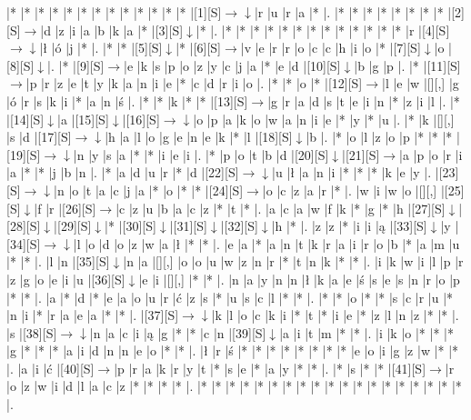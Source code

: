 \documentclass[11pt]{article}
\newcommand\drarr{$\rightarrow \!\!\!\!\! \downarrow$}
\newcommand\rarr{$\rightarrow$}
\newcommand\darr{$\downarrow$}
\begin{document}
\noindent\begin{Puzzle}{18}{29}|*	|*	|*	|*	|*	|*	|*	|*	|*	|*	|*	|*	|*	|[1][S]\drarr	|r	|u	|r	|a	|*	|.
|*	|*	|*	|*	|*	|*	|*	|*	|[2][S]\rarr	|d	|z	|i	|a	|b	|k	|a	|*	|[3][S]\darr	|*	|.
|*	|*	|*	|*	|*	|*	|*	|*	|*	|*	|*	|*	|*	|r	|[4][S]\drarr	|ł	|ó	|j	|*	|.
|*	|*	|[5][S]\darr	|*	|[6][S]\rarr	|v	|e	|r	|r	|o	|c	|c	|h	|i	|o	|*	|[7][S]\darr	|o	|[8][S]\darr	|.
|*	|[9][S]\rarr	|e	|k	|s	|p	|o	|z	|y	|c	|j	|a	|*	|e	|d	|[10][S]\darr	|b	|g	|p	|.
|*	|[11][S]\rarr	|p	|r	|z	|e	|t	|y	|k	|a	|n	|i	|e	|*	|c	|d	|r	|i	|o	|.
|*	|*	|o	|*	|[12][S]\rarr	|l	|e	|w	|[][,]{ }	|g	|ó	|r	|s	|k	|i	|*	|a	|n	|ś	|.
|*	|*	|k	|*	|*	|[13][S]\rarr	|g	|r	|a	|d	|s	|t	|e	|i	|n	|*	|z	|i	|l	|.
|*	|[14][S]\darr	|a	|[15][S]\darr	|[16][S]\drarr	|o	|p	|a	|k	|o	|w	|a	|n	|i	|e	|*	|y	|*	|u	|.
|*	|k	|[][,]{ }	|s	|d	|[17][S]\drarr	|h	|a	|l	|o	|g	|e	|n	|e	|k	|*	|l	|[18][S]\darr	|b	|.
|*	|o	|l	|z	|o	|p	|*	|*	|*	|[19][S]\drarr	|n	|y	|s	|a	|*	|*	|i	|e	|i	|.
|*	|p	|o	|t	|b	|d	|[20][S]\darr	|[21][S]\rarr	|a	|p	|o	|r	|i	|a	|*	|*	|j	|b	|n	|.
|*	|a	|d	|u	|r	|*	|d	|[22][S]\drarr	|u	|ł	|a	|n	|i	|*	|*	|*	|k	|e	|y	|.
|[23][S]\drarr	|n	|o	|t	|a	|c	|j	|a	|*	|o	|*	|*	|[24][S]\rarr	|o	|c	|z	|a	|r	|*	|.
|w	|i	|w	|o	|[][,]{ }	|[25][S]\darr	|f	|r	|[26][S]\rarr	|c	|z	|u	|b	|a	|c	|z	|*	|t	|*	|.
|a	|c	|a	|w	|f	|k	|*	|g	|*	|h	|[27][S]\darr	|[28][S]\darr	|[29][S]\darr	|*	|[30][S]\darr	|[31][S]\darr	|[32][S]\darr	|h	|*	|.
|z	|z	|*	|i	|i	|ą	|[33][S]\darr	|y	|[34][S]\drarr	|l	|o	|d	|o	|z	|w	|a	|ł	|*	|*	|.
|e	|a	|*	|a	|n	|t	|k	|r	|a	|i	|r	|o	|b	|*	|a	|m	|u	|*	|*	|.
|l	|n	|[35][S]\darr	|n	|a	|[][,]{ }	|o	|o	|u	|w	|z	|n	|r	|*	|t	|n	|k	|*	|*	|.
|i	|k	|w	|i	|l	|p	|r	|z	|g	|o	|e	|i	|u	|[36][S]\darr	|e	|i	|[][,]{ }	|*	|*	|.
|n	|a	|y	|n	|n	|ł	|k	|a	|e	|ś	|s	|e	|s	|n	|r	|o	|p	|*	|*	|.
|a	|*	|d	|*	|e	|a	|o	|u	|r	|ć	|z	|s	|*	|u	|s	|c	|l	|*	|*	|.
|*	|*	|o	|*	|*	|s	|c	|r	|u	|*	|n	|i	|*	|r	|a	|e	|a	|*	|*	|.
|[37][S]\drarr	|k	|l	|o	|c	|k	|i	|*	|t	|*	|i	|e	|*	|z	|l	|n	|z	|*	|*	|.
|s	|[38][S]\drarr	|n	|a	|c	|i	|ą	|g	|*	|*	|c	|n	|[39][S]\darr	|a	|i	|t	|m	|*	|*	|.
|i	|k	|o	|*	|*	|*	|g	|*	|*	|*	|a	|i	|d	|n	|n	|e	|o	|*	|*	|.
|ł	|r	|ś	|*	|*	|*	|*	|*	|*	|*	|*	|e	|o	|i	|g	|z	|w	|*	|*	|.
|a	|i	|ć	|[40][S]\rarr	|p	|r	|a	|k	|r	|y	|t	|*	|s	|e	|*	|a	|y	|*	|*	|.
|*	|s	|*	|*	|[41][S]\rarr	|r	|o	|z	|w	|i	|d	|l	|a	|c	|z	|*	|*	|*	|*	|.
|*	|*	|*	|*	|*	|*	|*	|*	|*	|*	|*	|*	|*	|*	|*	|*	|*	|*	|*	|.\end{Puzzle}

\newpage
\end{document}
